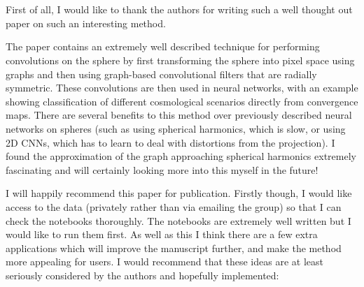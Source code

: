 \documentclass[12pt,a4paper]{article}
\newcommand{\todo}[1]{{\color[rgb]{.6,.1,.6}{TODO: #1}}}
\newcommand{\1}{\b{1}}              %
\newcommand{\0}{\b{0}}              %
\begin{document}
\section{}

\begin{mdframed}[style=comment]
First of all, I would like to thank the authors for writing such a well thought out paper on such an interesting method.

The paper contains an extremely well described technique for performing convolutions on the sphere by first transforming the sphere into pixel space using graphs and then using graph-based convolutional filters that are radially symmetric. These convolutions are then used in neural networks, with an example showing classification of different cosmological scenarios directly from convergence maps. There are several benefits to this method over previously described neural networks on spheres (such as using spherical harmonics, which is slow, or using 2D CNNs, which has to learn to deal with distortions from the projection). I found the approximation of the graph approaching spherical harmonics extremely fascinating and will certainly looking more into this myself in the future!

I will happily recommend this paper for publication. Firstly though, I would like access to the data (privately rather than via emailing the group) so that I can check the notebooks thoroughly. The notebooks are extremely well written but I would like to run them first. As well as this I think there are a few extra applications which will improve the manuscript further, and make the method more appealing for users. I would recommend that these ideas are at least seriously considered by the authors and hopefully implemented:
\end{mdframed}

\todo{Assigned @Tomek
\begin{itemize}
  \item Thank the reviewer
  \item give him access to data
\end{itemize}}

\subsection{}
\end{document}

